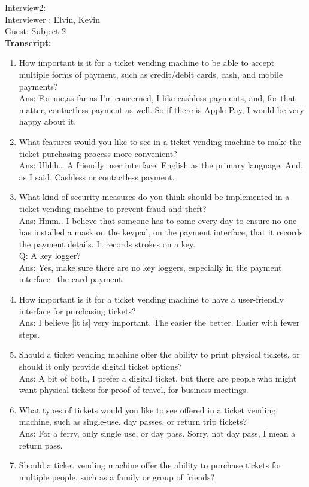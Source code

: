 Interview2:\\
Interviewer : Elvin, Kevin \\
Guest: Subject-2\\
\textbf{Transcript:}
\begin{enumerate}
    \item How important is it for a ticket vending machine to be able to accept multiple forms of payment, such as credit/debit cards, cash, and mobile payments?\\
Ans: For me,as far as I’m concerned, I like cashless payments, and, for that matter, contactless payment as well. So if there is Apple Pay, I would be very happy about it. 
    \item What features would you like to see in a ticket vending machine to make the ticket purchasing process more convenient?\\
Ans: Uhhh… A friendly user interface. English as the primary language. And, as I said, Cashless or contactless payment.
    \item What kind of security measures do you think should be implemented in a ticket vending machine to prevent fraud and theft?\\
Ans: Hmm.. I believe that someone has to come every day to ensure no one has installed a mask on the keypad, on the payment interface, that it records the payment details. It records strokes on a key.\\
Q: A key logger?\\
Ans: Yes, make sure there are no key loggers, especially in the payment interface-- the card payment.
    \item How important is it for a ticket vending machine to have a user-friendly interface for purchasing tickets?\\
Ans: I believe [it is] very important. The easier the better. Easier with fewer steps.
    \item Should a ticket vending machine offer the ability to print physical tickets, or should it only provide digital ticket options?\\
Ans: A bit of both, I prefer a digital ticket, but there are people who might want physical tickets for proof of travel, for business meetings.
    \item What types of tickets would you like to see offered in a ticket vending machine, such as single-use, day passes, or return trip tickets?\\
Ans: For a ferry, only single use, or day pass. Sorry, not day pass, I mean a return pass.
    \item Should a ticket vending machine offer the ability to purchase tickets for multiple people, such as a family or group of friends?\\

\end{enumerate}
